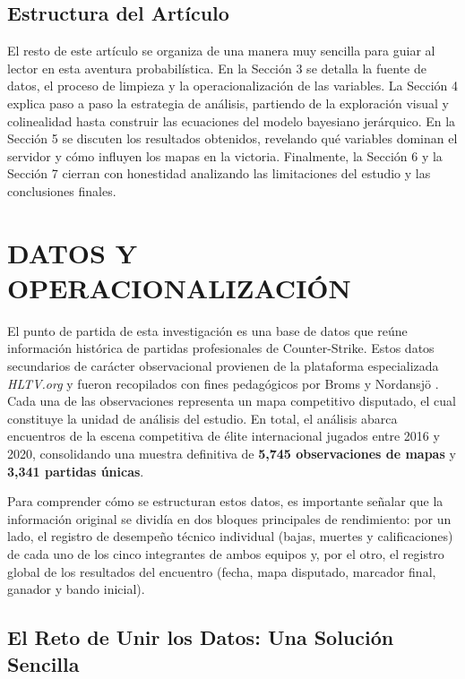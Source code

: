\documentclass[twocolumn,10pt]{article}
\begin{document}
\subsection{Estructura del Artículo}
El resto de este artículo se organiza de una manera muy sencilla para guiar al lector en esta aventura probabilística. En la Sección 3 se detalla la fuente de datos, el proceso de limpieza y la operacionalización de las variables. La Sección 4 explica paso a paso la estrategia de análisis, partiendo de la exploración visual y colinealidad hasta construir las ecuaciones del modelo bayesiano jerárquico. En la Sección 5 se discuten los resultados obtenidos, revelando qué variables dominan el servidor y cómo influyen los mapas en la victoria. Finalmente, la Sección 6 y la Sección 7 cierran con honestidad analizando las limitaciones del estudio y las conclusiones finales.

\section{DATOS Y OPERACIONALIZACIÓN}

El punto de partida de esta investigación es una base de datos que reúne información histórica de partidas profesionales de Counter-Strike. Estos datos secundarios de carácter observacional provienen de la plataforma especializada \textit{HLTV.org} \cite{hltv2024} y fueron recopilados con fines pedagógicos por Broms y Nordansjö \cite{csgodataset2020}. Cada una de las observaciones representa un mapa competitivo disputado, el cual constituye la unidad de análisis del estudio. En total, el análisis abarca encuentros de la escena competitiva de élite internacional jugados entre 2016 y 2020, consolidando una muestra definitiva de \textbf{5,745 observaciones de mapas} y \textbf{3,341 partidas únicas}.

Para comprender cómo se estructuran estos datos, es importante señalar que la información original se dividía en dos bloques principales de rendimiento: por un lado, el registro de desempeño técnico individual (bajas, muertes y calificaciones) de cada uno de los cinco integrantes de ambos equipos y, por el otro, el registro global de los resultados del encuentro (fecha, mapa disputado, marcador final, ganador y bando inicial). 

\subsection{El Reto de Unir los Datos: Una Solución Sencilla}
\end{document}
